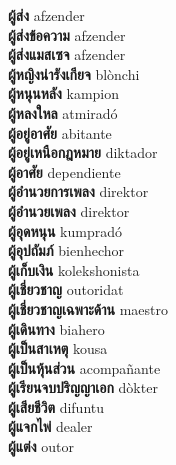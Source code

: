 \textbf{ ผู้ส่ง  } afzender \\
\textbf{ ผู้ส่งข้อความ  } afzender \\
\textbf{ ผู้ส่งแมสเซจ  } afzender \\
\textbf{ ผู้หญิงน่ารังเกียจ  } blònchi \\
\textbf{ ผู้หนุนหลัง  } kampion \\
\textbf{ ผู้หลงใหล  } atmiradó \\
\textbf{ ผู้อยู่อาศัย  } abitante \\
\textbf{ ผู้อยู่เหนือกฎหมาย  } diktador \\
\textbf{ ผู้อาศัย  } dependiente \\
\textbf{ ผู้อำนวยการเพลง  } direktor \\
\textbf{ ผู้อำนวยเพลง  } direktor \\
\textbf{ ผู้อุดหนุน  } kumpradó \\
\textbf{ ผู้อุปถัมภ์  } bienhechor \\
\textbf{ ผู้เก็บเงิน  } kolekshonista \\
\textbf{ ผู้เชี่ยวชาญ  } outoridat \\
\textbf{ ผู้เชี่ยวชาญเฉพาะด้าน  } maestro \\
\textbf{ ผู้เดินทาง  } biahero \\
\textbf{ ผู้เป็นสาเหตุ  } kousa \\
\textbf{ ผู้เป็นหุ้นส่วน  } acompañante \\
\textbf{ ผู้เรียนจบปริญญาเอก  } dòkter \\
\textbf{ ผู้เสียชีวิต  } difuntu \\
\textbf{ ผู้แจกไพ่  } dealer \\
\textbf{ ผู้แต่ง  } outor \\
